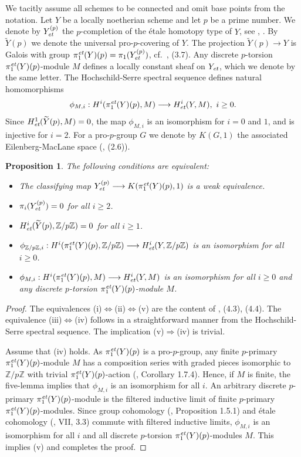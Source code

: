 \documentclass[10pt]{article}
\newcommand{\Z}{{\mathbb Z}}
\newcommand{\et}{\text{\it et}}
\theoremstyle{alex}
\newtheorem{proposition}[theorem]{Proposition}
\theoremstyle{alexdef}
\begin{document}
We tacitly assume all schemes to be connected and omit base points from the notation. Let $Y$ be a locally noetherian scheme and let $p$ be a prime number. We denote by $Y_\et^{(p)}$ the $p$-completion of the \'{e}tale homotopy type of $Y$, see \cite{AM}, \cite{Fr}. By $\widetilde{Y}{(p)}$ we denote the universal pro-$p$-covering of $Y$. The projection $\widetilde{Y}{(p)}\to Y$ is Galois with group $\pi_1^\et(Y)(p)=\pi_1(Y_\et^{(p)})$, cf.\ \cite{AM}, (3.7). Any discrete $p$-torsion $\pi_1^\et(Y)(p)$-module $M$ defines a locally constant sheaf on $Y_\et$, which we denote by the same letter.
The Hochschild-Serre spectral sequence defines natural homomorphisms
\[
\phi_{M,i}: H^i(\pi_1^\et(Y)(p), M) \longrightarrow H^i_\et(Y, M), \ i\geq 0.
\]
Since  $H^1_\et(\widetilde{Y}{(p)}, M)=0$, the map $\phi_{M,i}$ is an isomorphism for $i=0$ and $1$, and is injective for $i=2$.
For a pro-$p$-group $G$ we denote by $K(G,1)$ the associated Eilenberg-MacLane space (\cite{AM}, (2.6)).
\begin{proposition} \label{kpi1cond}
The following conditions are equivalent:
\begin{itemize}
\item[\rm (i)] The classifying map $Y_\et^{(p)} \longrightarrow K(\pi_1^\et(Y)(p),1)$ is a weak equivalence.
\item[\rm (ii)] $\pi_i(Y_\et^{(p)})=0$ for all $i\geq 2$.
\item[\rm (iii)] $H^i_\et (\widetilde{Y}{(p)}, \Z/p\Z)=0$ for all $i\geq 1$.
\item[\rm (iv)] $\phi_{\Z/p\Z,i}: H^i(\pi_1^\et(Y)(p),  \Z/p\Z) \longrightarrow H^i_\et(Y,  \Z/p\Z)$ is an isomorphism for all $i\geq 0$.
\item[\rm (v)] $\phi_{M,i}: H^i(\pi_1^\et(Y)(p), M) \longrightarrow H^i_\et(Y, M)$ is an isomorphism for all $i\geq 0$ and  any discrete $p$-torsion $\pi_1^\et(Y)(p)$-module $M$.
\end{itemize}
\end{proposition}

\begin{proof}
The equivalences (i)$\Leftrightarrow$(ii)$\Leftrightarrow$(v) are the content of  \cite{AM}, (4.3), (4.4). The equivalence (iii)$\Leftrightarrow$(iv) follows in a straightforward manner from the Hochschild-Serre spectral sequence. The implication (v)$\Rightarrow$(iv) is trivial.

Assume that (iv) holds. As $\pi_1^\et(Y)(p)$ is a pro-$p$-group, any finite $p$-primary $\pi_1^\et(Y)(p)$-module $M$ has a composition series with graded pieces isomorphic to $\Z/p\Z$ with trivial $\pi_1^\et(Y)(p)$-action (\cite{NSW}, Corollary 1.7.4). Hence, if $M$ is finite, the five-lemma implies that $\phi_{M, i}$ is an isomorphism for all $i$.  An arbitrary discrete $p$-primary $\pi_1^\et(Y)(p)$-module is the filtered inductive limit of finite $p$-primary $\pi_1^\et(Y)(p)$-modules.  Since group cohomology (\cite{NSW}, Proposition 1.5.1) and \'{e}tale cohomology (\cite{AGV}, VII, 3.3) commute with filtered inductive limits, $\phi_{M, i}$ is an isomorphism  for all $i$ and all discrete $p$-torsion $\pi_1^\et(Y)(p)$-modules $M$. This implies (v) and completes the proof.
\end{proof}
\end{document}
